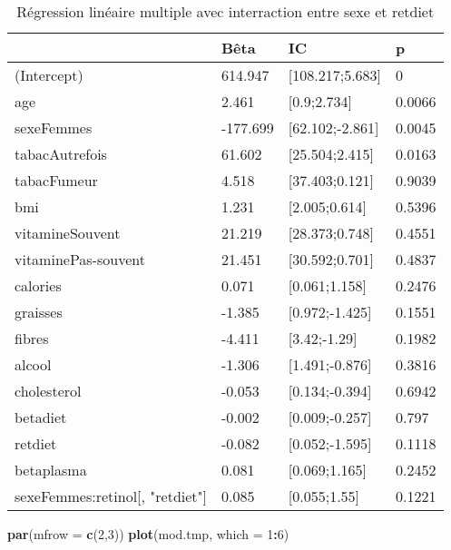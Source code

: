 \documentclass[]{article}
\newenvironment{Shaded}{\begin{snugshade}}{\end{snugshade}}
\newcommand{\KeywordTok}[1]{\textcolor[rgb]{0.13,0.29,0.53}{\textbf{#1}}}
\newcommand{\DataTypeTok}[1]{\textcolor[rgb]{0.13,0.29,0.53}{#1}}
\newcommand{\DecValTok}[1]{\textcolor[rgb]{0.00,0.00,0.81}{#1}}
\newcommand{\OperatorTok}[1]{\textcolor[rgb]{0.81,0.36,0.00}{\textbf{#1}}}
\newcommand{\NormalTok}[1]{#1}
\begin{document}
\begin{table}

\caption{\label{tab:unnamed-chunk-69}Régression linéaire multiple avec interraction entre sexe et retdiet}
\centering
\begin{tabular}[t]{l|l|l|l}
\hline
  & Bêta & IC & p\\
\hline
\rowcolor[HTML]{BBD2E1}  (Intercept) & 614.947 & [108.217;5.683] & 0\\
\hline
age & 2.461 & [0.9;2.734] & 0.0066\\
\hline
\rowcolor[HTML]{BBD2E1}  sexeFemmes & -177.699 & [62.102;-2.861] & 0.0045\\
\hline
tabacAutrefois & 61.602 & [25.504;2.415] & 0.0163\\
\hline
\rowcolor[HTML]{BBD2E1}  tabacFumeur & 4.518 & [37.403;0.121] & 0.9039\\
\hline
bmi & 1.231 & [2.005;0.614] & 0.5396\\
\hline
\rowcolor[HTML]{BBD2E1}  vitamineSouvent & 21.219 & [28.373;0.748] & 0.4551\\
\hline
vitaminePas-souvent & 21.451 & [30.592;0.701] & 0.4837\\
\hline
\rowcolor[HTML]{BBD2E1}  calories & 0.071 & [0.061;1.158] & 0.2476\\
\hline
graisses & -1.385 & [0.972;-1.425] & 0.1551\\
\hline
\rowcolor[HTML]{BBD2E1}  fibres & -4.411 & [3.42;-1.29] & 0.1982\\
\hline
alcool & -1.306 & [1.491;-0.876] & 0.3816\\
\hline
\rowcolor[HTML]{BBD2E1}  cholesterol & -0.053 & [0.134;-0.394] & 0.6942\\
\hline
betadiet & -0.002 & [0.009;-0.257] & 0.797\\
\hline
\rowcolor[HTML]{BBD2E1}  retdiet & -0.082 & [0.052;-1.595] & 0.1118\\
\hline
betaplasma & 0.081 & [0.069;1.165] & 0.2452\\
\hline
\rowcolor[HTML]{BBD2E1}  sexeFemmes:retinol[, "retdiet"] & 0.085 & [0.055;1.55] & 0.1221\\
\hline
\end{tabular}
\end{table}

\begin{Shaded}
\begin{Highlighting}[]
\KeywordTok{par}\NormalTok{(}\DataTypeTok{mfrow =} \KeywordTok{c}\NormalTok{(}\DecValTok{2}\NormalTok{,}\DecValTok{3}\NormalTok{))}
\KeywordTok{plot}\NormalTok{(mod.tmp, }\DataTypeTok{which =} \DecValTok{1}\OperatorTok{:}\DecValTok{6}\NormalTok{)}
\end{Highlighting}
\end{Shaded}
\end{document}
